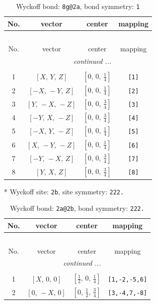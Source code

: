 \documentclass[fleqn,8pt]{jsarticle}
\begin{document}
\renewcommand{\arraystretch}{1.2}
\begin{longtable}{cccc}
\caption{Wyckoff bond: {\tt 8g@2a}, bond symmetry: {\tt 1}}
 \\
 \hline \hline
No. & vector & center & mapping \\ \hline \endfirsthead

\multicolumn{3}{l}{\tablename\ \thetable{}} \\
 \hline \hline
No. & vector & center & mapping \\ \hline \endhead

 \hline \hline
\multicolumn{3}{r}{\footnotesize\it continued ...} \\ \endfoot

 \hline \hline
\multicolumn{3}{r}{} \\ \endlastfoot

1 & $\left[ X,\, Y,\, Z \right]$ & $\left[ 0,\, 0,\, \frac{1}{4} \right]$ & {\tt [1]} \\ \hline
2 & $\left[ - X,\, - Y,\, Z \right]$ & $\left[ 0,\, 0,\, \frac{1}{4} \right]$ & {\tt [2]} \\ \hline
3 & $\left[ Y,\, - X,\, - Z \right]$ & $\left[ 0,\, 0,\, \frac{3}{4} \right]$ & {\tt [3]} \\ \hline
4 & $\left[ - Y,\, X,\, - Z \right]$ & $\left[ 0,\, 0,\, \frac{3}{4} \right]$ & {\tt [4]} \\ \hline
5 & $\left[ - X,\, Y,\, - Z \right]$ & $\left[ 0,\, 0,\, \frac{1}{4} \right]$ & {\tt [5]} \\ \hline
6 & $\left[ X,\, - Y,\, - Z \right]$ & $\left[ 0,\, 0,\, \frac{1}{4} \right]$ & {\tt [6]} \\ \hline
7 & $\left[ - Y,\, - X,\, Z \right]$ & $\left[ 0,\, 0,\, \frac{3}{4} \right]$ & {\tt [7]} \\ \hline
8 & $\left[ Y,\, X,\, Z \right]$ & $\left[ 0,\, 0,\, \frac{3}{4} \right]$ & {\tt [8]} \\
\end{longtable}
* Wyckoff site: {\tt 2b}, site symmetry: {\tt 222.}
\renewcommand{\arraystretch}{1.2}
\begin{longtable}{cccc}
\caption{Wyckoff bond: {\tt 2a@2b}, bond symmetry: {\tt 222.}}
 \\
 \hline \hline
No. & vector & center & mapping \\ \hline \endfirsthead

\multicolumn{3}{l}{\tablename\ \thetable{}} \\
 \hline \hline
No. & vector & center & mapping \\ \hline \endhead

 \hline \hline
\multicolumn{3}{r}{\footnotesize\it continued ...} \\ \endfoot

 \hline \hline
\multicolumn{3}{r}{} \\ \endlastfoot

1 & $\left[ X,\, 0,\, 0 \right]$ & $\left[ \frac{1}{2},\, 0,\, \frac{1}{4} \right]$ & {\tt [1,-2,-5,6]} \\ \hline
2 & $\left[ 0,\, - X,\, 0 \right]$ & $\left[ 0,\, \frac{1}{2},\, \frac{3}{4} \right]$ & {\tt [3,-4,7,-8]} \\
\end{longtable}
\end{document}
